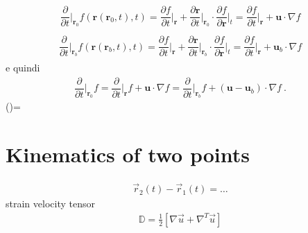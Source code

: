 \documentclass[letterpaper,10pt,english]{jupyterBook}
\begin{document}
\begin{equation*}
\begin{split}\begin{aligned}
\dfrac{\partial}{\partial t}\bigg|_{\mathbf{r}_0} f(\mathbf{r}(\mathbf{r}_0, t), t) 
    = \dfrac{\partial f}{\partial t}\bigg|_{\mathbf{r}} +
    \dfrac{\partial \mathbf{r}}{\partial t}\bigg|_{\mathbf{r}_0} \cdot \dfrac{\partial f}{\partial \mathbf{r}}\bigg|_{t} 
    = \dfrac{\partial f}{\partial t}\bigg|_{\mathbf{r}} +
      \mathbf{u} \cdot \nabla f 
\end{aligned}\end{split}
\end{equation*}\begin{equation*}
\begin{split}\begin{aligned}
\dfrac{\partial}{\partial t}\bigg|_{\mathbf{r}_b} f(\mathbf{r}(\mathbf{r}_b, t), t) 
    = \dfrac{\partial f}{\partial t}\bigg|_{\mathbf{r}} +
    \dfrac{\partial \mathbf{r}}{\partial t}\bigg|_{\mathbf{r}_b} \cdot \dfrac{\partial f}{\partial \mathbf{r}}\bigg|_{t} 
    = \dfrac{\partial f}{\partial t}\bigg|_{\mathbf{r}} +
      \mathbf{u}_b \cdot \nabla f 
\end{aligned}\end{split}
\end{equation*}
\sphinxAtStartPar
e quindi
\begin{equation*}
\begin{split}
\dfrac{\partial}{\partial t}\bigg|_{\mathbf{r}_0} f =  
\dfrac{\partial}{\partial t}\bigg|_{\mathbf{r}  } f + \mathbf{u} \cdot \nabla f =  
\dfrac{\partial}{\partial t}\bigg|_{\mathbf{r}_b} f + ( \mathbf{u} - \mathbf{u}_b ) \cdot \nabla f \ . 
\end{split}
\end{equation*}
\sphinxAtStartPar
()=


\section{Kinematics of two points}
\label{\detokenize{ch/continuum/kinematics:kinematics-of-two-points}}\begin{equation*}
\begin{split}\vec{r}_2(t) - \vec{r}_1(t) = \dots \end{split}
\end{equation*}
\sphinxAtStartPar
strain velocity tensor
\begin{equation}\label{equation:ch/continuum/kinematics:eq:strain-vel-tensor}
\begin{split}\mathbb{D} = \frac{1}{2} \left[ \nabla \vec{u} + \nabla^T \vec{u} \right]\end{split}
\end{equation}
\sphinxstepscope
\end{document}
